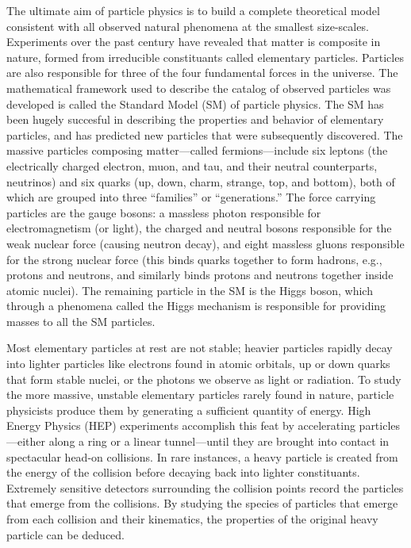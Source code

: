 The ultimate aim of particle physics is to build a complete theoretical model consistent with all observed natural phenomena at the smallest size-scales. Experiments over the past century have revealed that matter is composite in nature, formed from irreducible constituants called elementary particles. Particles are also responsible for three of the four fundamental forces in the universe. The mathematical framework used to describe the catalog of observed particles was developed is called the Standard Model (SM) of particle physics. The SM has been hugely succesful in describing the properties and behavior of elementary particles, and has predicted new particles that were subsequently discovered. The massive particles composing matter---called fermions---include six leptons (the electrically charged electron, muon, and tau, and their neutral counterparts, neutrinos) and six quarks (up, down, charm, strange, top, and bottom), both of which are grouped into three ``families'' or ``generations.'' The force carrying particles are the gauge bosons: a massless photon responsible for electromagnetism (or light), the charged \PW and neutral \PZ bosons responsible for the weak nuclear force (causing neutron decay), and eight massless gluons responsible for the strong nuclear force (this binds quarks together to form hadrons, e.g., protons and neutrons, and similarly binds protons and neutrons together inside atomic nuclei). The remaining particle in the SM is the Higgs boson, which through a phenomena called the Higgs mechanism is responsible for providing masses to all the SM particles.
 
Most elementary particles at rest are not stable; heavier particles rapidly decay into lighter particles like electrons found in atomic orbitals, up or down quarks that form stable nuclei, or the photons we observe as light or radiation. To study the more massive, unstable elementary particles rarely found in nature, particle physicists produce them by generating a sufficient quantity of energy. High Energy Physics (HEP) experiments accomplish this feat by accelerating particles---either along a ring or a linear tunnel---until they are brought into contact in spectacular head-on collisions. In rare instances, a heavy particle is created from the energy of the collision before decaying back into lighter constituants. Extremely sensitive detectors surrounding the collision points record the particles that emerge from the collisions. By studying the species of particles that emerge from each collision and their kinematics, the properties of the original heavy particle can be deduced.

